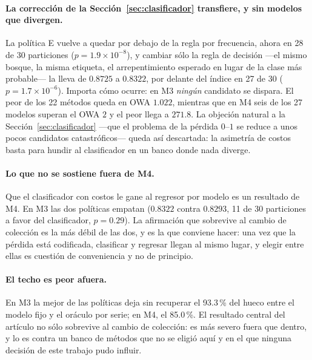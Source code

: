 \paragraph{La corrección de la Sección~\ref{sec:clasificador} transfiere, y sin modelos
que divergen.} La política E vuelve a quedar por debajo de la regla por frecuencia, ahora
en 28 de 30 particiones ($p=1.9\times10^{-8}$), y cambiar sólo la regla de decisión ---el
mismo bosque, la misma etiqueta, el arrepentimiento esperado en lugar de la clase más
probable--- la lleva de $0.8725$ a $0.8322$, por delante del índice en 27 de 30
($p=1.7\times10^{-6}$). Importa cómo ocurre: en M3 \emph{ningún} candidato se dispara. El
peor de los 22 métodos queda en OWA $1.022$, mientras que en M4 seis de los 27 modelos
superan el OWA $2$ y el peor llega a $271.8$. La objeción natural a la
Sección~\ref{sec:clasificador} ---que el problema de la pérdida $0$--$1$ se reduce a unos
pocos candidatos catastróficos--- queda así descartada: la asimetría de costos basta para
hundir al clasificador en un banco donde nada diverge.

\paragraph{Lo que no se sostiene fuera de M4.} Que el clasificador con costos le gane al
regresor por modelo es un resultado de M4. En M3 las dos políticas empatan ($0.8322$
contra $0.8293$, 11 de 30 particiones a favor del clasificador, $p=0.29$). La afirmación
que sobrevive al cambio de colección es la más débil de las dos, y es la que conviene
hacer: una vez que la pérdida está codificada, clasificar y regresar llegan al mismo
lugar, y elegir entre ellas es cuestión de conveniencia y no de principio.

\paragraph{El techo es peor afuera.} En M3 la mejor de las políticas deja sin recuperar el
93.3\,\% del hueco entre el modelo fijo y el oráculo por serie; en M4, el 85.0\,\%. El
resultado central del artículo no sólo sobrevive al cambio de colección: es más severo
fuera que dentro, y lo es contra un banco de métodos que no se eligió aquí y en el que
ninguna decisión de este trabajo pudo influir.

